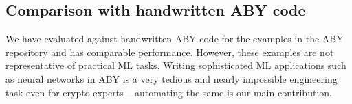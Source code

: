 \subsection{Comparison with handwritten ABY code}

We have evaluated against handwritten ABY code for the examples in the ABY repository and \tool has comparable performance. However, these examples are not representative of practical ML tasks. Writing sophisticated ML applications such as neural networks in ABY is a very tedious and nearly impossible engineering task even for crypto experts -- automating the same is our main contribution.


